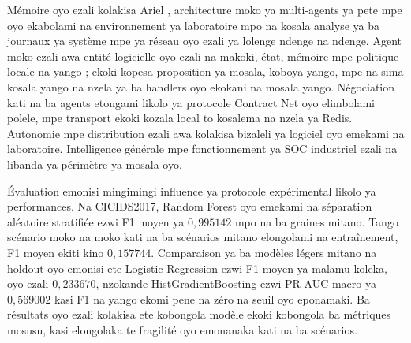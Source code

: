 
Mémoire oyo ezali kolakisa Ariel \logminer{}, architecture moko ya
multi-agents ya pete mpe oyo ekabolami na environnement ya laboratoire
mpo na kosala analyse ya ba journaux ya système mpe ya réseau oyo ezali
ya lolenge ndenge na ndenge. Agent moko ezali awa entité logicielle oyo
ezali na makoki, état, mémoire mpe politique locale na yango ; ekoki
kopesa proposition ya mosala, koboya yango, mpe na sima kosala yango na
nzela ya ba handlers oyo ekokani na mosala yango. Négociation kati na
ba agents etongami likolo ya protocole Contract Net oyo elimbolami
polele, mpe transport ekoki kozala local to kosalema na nzela ya Redis.
Autonomie mpe distribution ezali awa kolakisa bizaleli ya logiciel oyo
emekami na laboratoire. Intelligence générale mpe fonctionnement ya SOC
industriel ezali na libanda ya périmètre ya mosala oyo.

Évaluation emonisi mingimingi influence ya protocole expérimental likolo
ya performances. Na CICIDS2017, Random Forest oyo emekami na séparation
aléatoire stratifiée ezwi F1 moyen ya $0{,}995142$ mpo na ba graines
mitano. Tango scénario moko na moko kati na ba scénarios mitano
elongolami na entraînement, F1 moyen ekiti kino $0{,}157744$.
Comparaison ya ba modèles légers mitano na holdout oyo emonisi ete
Logistic Regression ezwi F1 moyen ya malamu koleka, oyo ezali
$0{,}233670$, nzokande HistGradientBoosting ezwi PR-AUC macro ya
$0{,}569002$ kasi F1 na yango ekomi pene na zéro na seuil oyo eponamaki.
Ba résultats oyo ezali kolakisa ete kobongola modèle ekoki kobongola ba
métriques mosusu, kasi elongolaka te fragilité oyo emonanaka kati na ba
scénarios.

